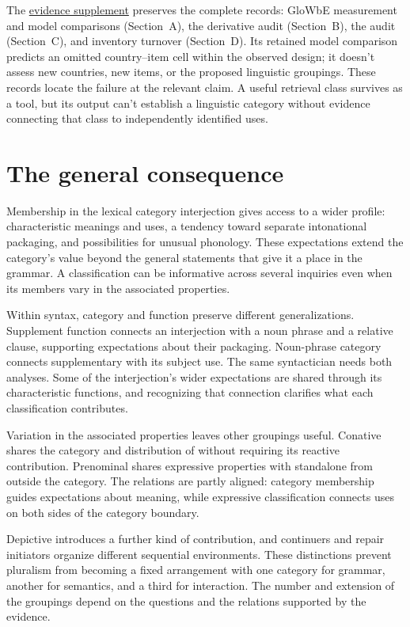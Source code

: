 \documentclass[12pt]{article}
\begin{document}
The \href{inquiry-relative-evidence-supplement.pdf}{evidence supplement}
preserves the complete records: GloWbE measurement and model comparisons
(Section~A), the derivative audit (Section~B), the  audit
(Section~C), and inventory turnover (Section~D). Its retained model
comparison predicts an omitted country--item cell within the observed
design; it doesn't assess new countries, new items, or the proposed
linguistic groupings. These records locate
the failure at the relevant claim. A useful retrieval class survives
as a tool, but its output can't establish a linguistic category
without evidence connecting that class to independently identified uses.

\section{The general consequence}\label{sec:discussion}

Membership in the lexical category interjection gives access to a wider
profile: characteristic meanings and uses, a tendency toward separate
intonational packaging, and possibilities for unusual phonology. These
expectations extend the category's value beyond the general statements
that give it a place in the grammar. A classification can be informative across several inquiries
even when its members vary in the associated properties.

Within syntax, category and function preserve different generalizations.
Supplement function connects an interjection with a noun phrase and
a relative clause, supporting expectations about their packaging. Noun-phrase
category connects supplementary  with its subject
use. The same syntactician needs both analyses. Some of the interjection's
wider expectations are shared through its characteristic functions, and
recognizing that connection clarifies what each classification contributes.

Variation in the associated properties leaves other groupings useful.
Conative  shares the category and distribution of 
without requiring its reactive contribution. Prenominal 
shares expressive properties with standalone  from outside
the category. The relations are partly aligned: category membership guides
expectations about meaning, while expressive classification connects uses
on both sides of the category boundary.

Depictive  introduces a further kind of contribution, and continuers
and repair initiators organize different sequential environments. These
distinctions prevent pluralism from becoming a fixed arrangement with
one category for grammar, another for semantics, and a third for interaction.
The number and extension of the groupings depend on the questions
and the relations supported by the evidence.
\end{document}
